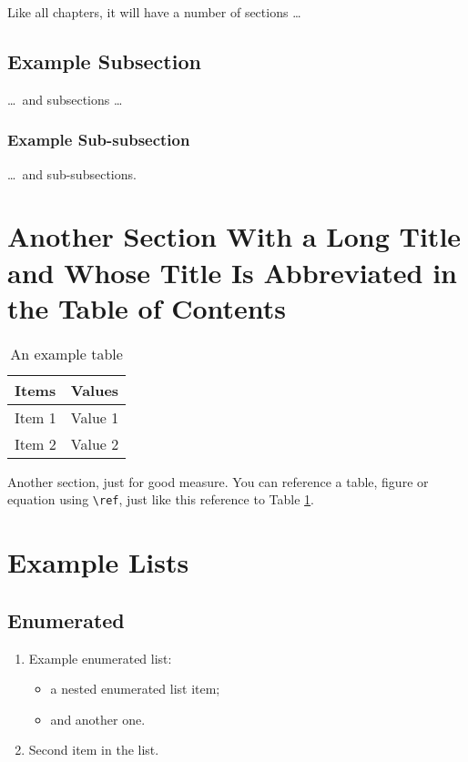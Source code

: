 \documentclass[12pt,a4paper]{report}
\begin{document}
Like all chapters, it will have a number of sections \dots

\subsection{Example Subsection}
\dots\ and subsections \dots

\subsubsection{Example Sub-subsection}
\dots\ and sub-subsections.

\section[Short Section Title]{Another Section With a Long Title and Whose Title Is Abbreviated in the Table of Contents}

\begin{table}[htb]
\caption{An example table}
\bigskip
\begin{center}
\label{Example-Table}
\begin{tabular}{|l|l|}
\hline
Items & Values \\
\hline
\hline
Item 1 & Value 1 \\
Item 2 & Value 2 \\
\hline
\end{tabular}
\end{center}
\end{table}

Another section, just for good measure. You can reference a table, figure or equation using \verb|\ref|, just like this reference to Table \ref{Example-Table}.

\section{Example Lists}

\subsection{Enumerated}

\begin{enumerate}
\item Example enumerated list:
  \begin{itemize}
  \item a nested enumerated list item;
  \item and another one.
  \end{itemize}
\item Second item in the list.
\end{enumerate}
\end{document}

